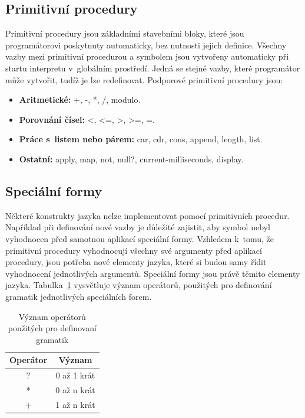 \documentclass[
  master,
  biblatex,
  figures=true,
  theorems,
  sourcecodes,
  glossaries,
  index
]{kidiplom}
\begin{document}
\subsection{Primitivní procedury} 
Primitivní procedury jsou základními stavebními bloky, které jsou programátorovi poskytnuty automaticky, bez nutnosti jejich definice. Všechny vazby mezi primitivní procedurou a symbolem jsou vytvořeny automaticky při startu interpretu v~globálním prostředí. Jedná se stejné vazby, které programátor může vytvořit, tudíž je lze redefinovat. Podporové primitivní procedury jsou: 

\begin{itemize}
    \item \textbf{Aritmetické:} +, -, *, /, modulo.
    \item \textbf{Porovnání čísel:} <, <=, >, >=, =.
    \item \textbf{Práce s~listem nebo párem:} car, cdr, cons, append, length, list.
    \item \textbf{Ostatní:} apply, map, not, null?, current-milliseconds, display.
\end{itemize}

\subsection{Speciální formy} 
Některé konstrukty jazyka nelze implementovat pomocí primitivních procedur. Například při definování nové vazby je důležité zajistit, aby symbol nebyl vyhodnocen před samotnou aplikací speciální formy. Vzhledem k~tomu, že primitivní procedury vyhodnocují všechny své argumenty před aplikací procedury, jsou potřeba nové elementy jazyka, které si budou samy řídit vyhodnocení jednotlivých argumentů. Speciální formy jsou právě těmito elementy jazyka. Tabulka~\ref{table-operators} vysvětluje význam operátorů, použitých pro definování gramatik jednotlivých speciálních forem. 


\begin{table}[ht]
\centering
\begin{tabular}{|c|c|}
    \hline
    \textbf{Operátor} & \textbf{Význam} \\
    \hline
    ? & 0 až 1 krát \\
    * & 0 až n krát \\
    + & 1 až n krát \\
    \hline
\end{tabular}
\caption{Význam operátorů použitých pro definovaní gramatik}
\label{table-operators}
\end{table}
\end{document}
